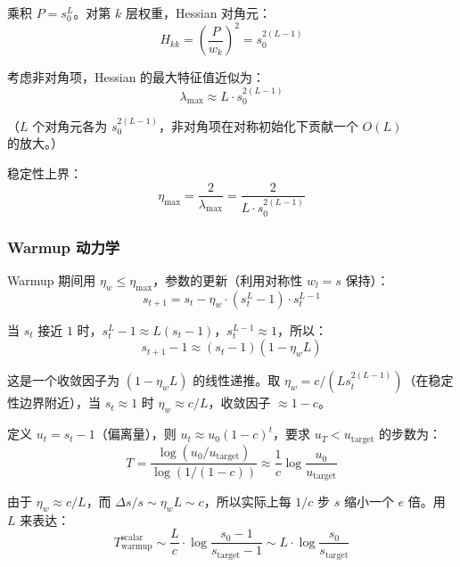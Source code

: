 \documentclass[12pt, a4paper]{ctexart}
\begin{document}
乘积 $P = s_0^L$。对第 $k$ 层权重，Hessian 对角元：
\begin{equation}
    H_{kk} = \left(\frac{P}{w_k}\right)^2 = s_0^{2(L-1)}
\end{equation}

考虑非对角项，Hessian 的最大特征值近似为：
\begin{equation}
    \lambda_{\max} \approx L \cdot s_0^{2(L-1)}
\end{equation}

（$L$ 个对角元各为 $s_0^{2(L-1)}$，非对角项在对称初始化下贡献一个 $O(L)$ 的放大。）

稳定性上界：
\begin{equation}
    \eta_{\max} = \frac{2}{\lambda_{\max}} = \frac{2}{L \cdot s_0^{2(L-1)}}
\end{equation}

\subsubsection{Warmup 动力学}

Warmup 期间用 $\eta_w \leq \eta_{\max}$，参数的更新（利用对称性 $w_l = s$ 保持）：
\begin{equation}
    s_{t+1} = s_t - \eta_w \cdot (s_t^L - 1) \cdot s_t^{L-1}
\end{equation}

当 $s_t$ 接近 $1$ 时，$s_t^L - 1 \approx L(s_t - 1)$，$s_t^{L-1} \approx 1$，所以：
\begin{equation}
    s_{t+1} - 1 \approx (s_t - 1)(1 - \eta_w L)
\end{equation}

这是一个收敛因子为 $(1 - \eta_w L)$ 的线性递推。取 $\eta_w = c/(Ls_t^{2(L-1)})$（在稳定性边界附近），当 $s_t \approx 1$ 时 $\eta_w \approx c/L$，收敛因子 $\approx 1 - c$。

定义 $u_t = s_t - 1$（偏离量），则 $u_t \approx u_0 (1-c)^t$，要求 $u_T < u_{\text{target}}$ 的步数为：
\begin{equation}
    T = \frac{\log(u_0/u_{\text{target}})}{\log(1/(1-c))} \approx \frac{1}{c}\log\frac{u_0}{u_{\text{target}}}
\end{equation}

由于 $\eta_w \approx c/L$，而 $\Delta s/s \sim \eta_w L \sim c$，所以实际上每 $1/c$ 步 $s$ 缩小一个 $e$ 倍。用 $L$ 来表达：
\begin{equation}
    \boxed{T_{\text{warmup}}^{\text{scalar}} \sim \frac{L}{c} \cdot \log\frac{s_0 - 1}{s_{\text{target}} - 1} \sim L \cdot \log\frac{s_0}{s_{\text{target}}}}
\end{equation}
\end{document}
